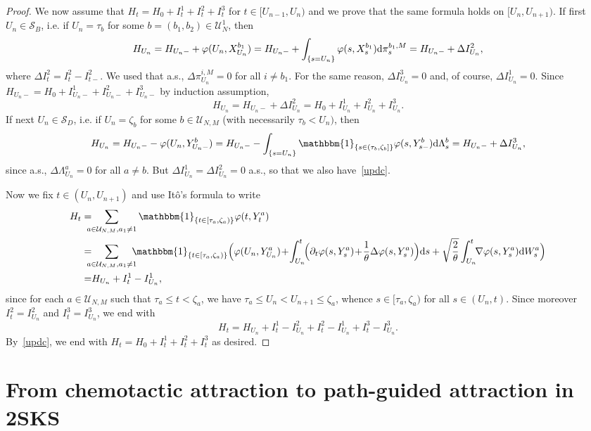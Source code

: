 \documentclass[11pt]{article}
\newcommand{\1}{\mathbbm{1}}
\newcommand{\dd}{{\rm d}}
\newcommand{\Ss}{\mathcal S}
\newcommand{\Uu}{\mathcal U}
\newcommand{\sm}{{s-}}
\newcommand{\vip}{\vskip5pt}
\begin{document}
\begin{proof}
We now assume that $H_t=H_0+I_t^1+I^2_t+I^3_t$ for $t\in [U_{n-1},U_n)$ and we prove that the same formula
holds on $[U_n,U_{n+1})$. If first $U_n \in \Ss_B$, i.e. if $U_n=\tau_b$ for some $b=(b_1,b_2) \in \Uu^1_N$,
then
$$
H_{U_n}=H_{U_n-}+\varphi(U_n,X^{b_1}_{U_n})=H_{U_n-}+\int_{\{s=U_n\}}\varphi(s,X^{b_1}_{s}) \dd\pi^{b_1,M}_s
=H_{U_n-}+\Delta I^2_{U_n},
$$
where $\Delta I^2_t=I^2_{t}-I^2_{t-}$. We used that
a.s., $\Delta \pi^{i,M}_{U_n}=0$ for all $i\neq b_1$. For the same reason, $\Delta I^3_{U_n}=0$ and, of course,
$\Delta I^1_{U_n}=0$. Since $H_{U_n-}=H_0+I^1_{U_n-}+I^2_{U_n-}+I^3_{U_n-}$ by induction assumption,
\begin{equation}\label{updc}
H_{U_n}=H_{U_n-}+\Delta I^2_{U_n}=H_0+I^1_{U_n}+I^2_{U_n}+I^3_{U_n}.
\end{equation}
If next $U_n \in \Ss_D$, i.e. if $U_n=\zeta_b$ for some $b \in \Uu_{N,M}$ (with necessarily
$\tau_b <U_n)$, then
$$
H_{U_n}=H_{U_n-}-\varphi(U_n,Y^b_{U_n-})=H_{U_n-}-\int_{\{s=U_n\}}\1_{\{s\in (\tau_b,\zeta_b]\}}\varphi(s,Y^{b}_\sm) \dd\Lambda^{b}_s
=H_{U_n-}+\Delta I^3_{U_n},
$$
since a.s., $\Delta\Lambda^a_{U_n}=0$ for all $a\neq b$. But $\Delta I^1_{U_n}=\Delta I^2_{U_n}=0$ a.s., so that
we also have~\eqref{updc}. 
\vip

Now we fix $t\in (U_n,U_{n+1})$ and use Itô's formula to write
\begin{align*}
H_t=&\!\!\!\!\sum_{a\in \Uu_{N,M},a_1\neq 1}\1_{\{t\in [\tau_a,\zeta_a)\}}\varphi(t,Y^a_t)\\
=&\!\!\!\!\sum_{a\in \Uu_{N,M},a_1\neq 1} \!\!\!\!\1_{\{t\in [\tau_a,\zeta_a)\}}\Big(\varphi(U_n,Y^a_{U_n}) 
\!+\! \int_{U_n}^t \!\! \Big(\partial_t\varphi(s,Y^a_s)\!+\!\frac1\theta
\Delta \varphi(s,Y^a_s)\Big) \dd s+
\sqrt{\frac 2 \theta}\int_{U_n}^t\!\!
\nabla\varphi(s,Y^{a}_s) \dd W^a_s\Big)\\
=&H_{U_n}+ I^1_t-I^1_{U_n},
\end{align*}
since for each $a \in \Uu_{N,M}$ such that $\tau_a\leq t<\zeta_a$, we have $\tau_a\leq U_n<U_{n+1}\leq \zeta_a$, 
whence $s\in [\tau_a,\zeta_a)$ for all $s \in (U_n,t)$. Since moreover
$I^2_t=I^2_{U_n}$ and $I^3_t=I^3_{U_n}$, we end with 
$$
H_t=H_{U_n}+I^1_t-I^2_{U_n}+I^2_t-I^1_{U_n}+I^3_t-I^3_{U_n}.
$$
By~\eqref{updc}, we end with $H_t=H_0+I^1_t+I^2_t+I^3_t$ as desired.
\end{proof}


\section{From chemotactic attraction to path-guided attraction in 2SKS}
\label{fcat}
\end{document}
